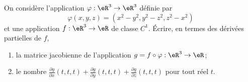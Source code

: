 \begin{exercice}\label{exoCalculDifferentiel0006}


 On considère l'application $\varphi :\eR^3\to \eR^3$ définie par
 \begin{equation}
	\varphi (x,y,z)= (x^2-y^2, y^2-z^2, z^2-x^2)
 \end{equation}
et une application $f:\eR^3\to \eR$ de classe $C^1$. Écrire, en termes des dérivées partielles de $f$,
\begin{enumerate}
	\item
 la matrice jacobienne de l'application $g=f\circ \varphi :\eR^3\to \eR$;
\item
le nombre $\displaystyle \frac{\partial g}{\partial x}(t,t,t)+ \displaystyle \frac{\partial g}{\partial y}(t,t,t)+ \displaystyle \frac{\partial g}{\partial z}(t,t,t) $ pour tout réel $t$.
\end{enumerate}

\end{exercice}
